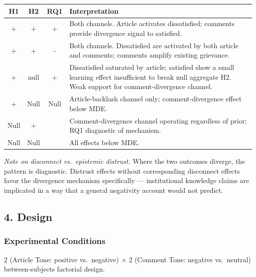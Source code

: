\documentclass[
  12pt]{article}
\begin{document}
\begin{tabular}{@{}cccp{11cm}@{}}
\hline
\textbf{H1} & \textbf{H2} & \textbf{RQ1} & \textbf{Interpretation} \\
\hline
$+$ & $+$ & + & Both channels. Article activates dissatisfied; comments provide divergence signal to satisfied. \\[3pt]
$+$ & $+$ & - & Both channels. Dissatisfied are activated by both article and comments; comments amplify existing grievance. \\[3pt]
$+$ & null & + & Dissatisfied saturated by article; satisfied show a small learning effect insufficient to break null aggregate H2. Weak support for comment-divergence channel. \\[3pt]
$+$ & Null & Null & Article-backlash channel only; comment-divergence effect below MDE. \\[3pt]
Null & $+$ & & Comment-divergence channel operating regardless of prior; RQ1 diagnostic of mechanism. \\[3pt]
Null & Null & & All effects below MDE. \\
\hline
\end{tabular}

\emph{Note on disconnect vs.~epistemic distrust.} Where the two outcomes
diverge, the pattern is diagnostic. Distrust effects without
corresponding disconnect effects favor the divergence mechanism
specifically --- institutional knowledge claims are implicated in a way
that a general negativity account would not predict.

\subsection{4. Design}\label{design}

\subsubsection{Experimental Conditions}\label{experimental-conditions}

2 (Article Tone: positive vs.~negative) × 2 (Comment Tone: negative
vs.~neutral) between-subjects factorial design.
\end{document}
